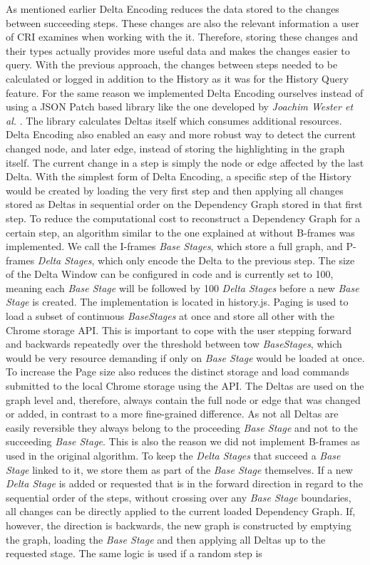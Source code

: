 As mentioned earlier Delta Encoding reduces the data stored to the changes between succeeding steps. These changes are also the relevant information a user of CRI examines when working with the it. Therefore, storing these changes and their types actually provides more useful data and makes the changes easier to query. With the previous approach, the changes between steps needed to be calculated or logged in addition to the History as it was for the History Query feature. For the same reason we implemented Delta Encoding ourselves instead of using a JSON Patch \cite{JSONPatch} based library like the one developed by \emph{Joachim Wester et al.} \cite{JSONPatchImplementation}. The library calculates Deltas itself which consumes additional resources. Delta Encoding also enabled an easy and more robust way to detect the current changed node, and later edge, instead of storing the highlighting in the graph itself. The current change in a step is simply the node or edge affected by the last Delta. With the simplest form of Delta Encoding, a specific step of the History would be created by loading the very first step and then applying all changes stored as Deltas in sequential order on the Dependency Graph stored in that first step. To reduce the computational cost to reconstruct a Dependency Graph for a certain step, an algorithm similar to the one explained at \cite{VideoEncoding} without B-frames was implemented. We call the I-frames \emph{Base Stages}, which store a full graph, and P-frames \emph{Delta Stages}, which only encode the Delta to the previous step. The size of the Delta Window can be configured in code and is currently set to 100, meaning each \emph{Base Stage} will be followed by 100 \emph{Delta Stages} before a new \emph{Base Stage} is created. The implementation is located in history.js. Paging is used to load a subset of continuous \emph{BaseStages} at once and store all other with the Chrome storage API. This is important to cope with the user stepping forward and backwards repeatedly over the threshold between tow \emph{BaseStages}, which would be very resource demanding if only on \emph{Base Stage} would be loaded at once. To increase the Page size also reduces the distinct storage and load commands submitted to the local Chrome storage using the API. The Deltas are used on the graph level and, therefore, always contain the full node or edge that was changed or added, in contrast to a more fine-grained difference. As not all Deltas are easily reversible they always belong to the proceeding \emph{Base Stage} and not to the succeeding \emph{Base Stage}. This is also the reason we did not implement B-frames as used in the original algorithm. To keep the \emph{Delta Stages} that succeed a \emph{Base Stage} linked to it, we store them as part of the \emph{Base Stage} themselves. If a new \emph{Delta Stage} is added or requested that is in the forward direction in regard to the sequential order of the steps, without crossing over any \emph{Base Stage} boundaries, all changes can be directly applied to the current loaded Dependency Graph. If, however, the direction is backwards, the new graph is constructed by emptying the graph, loading the \emph{Base Stage} and then applying all Deltas up to the requested stage. The same logic is used if a random step is 